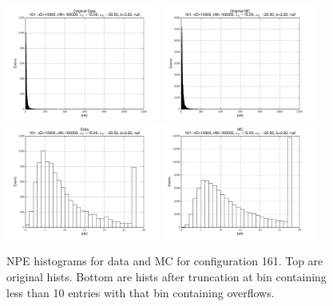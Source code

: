  \begin{figure}[htbp] \begin{center} 
\includegraphics[width=0.45\textwidth]{../FIGURES/161/FIG_Original_Data.pdf} 
\includegraphics[width=0.45\textwidth]{../FIGURES/161/FIG_Original_MC.pdf} 
\includegraphics[width=0.45\textwidth]{../FIGURES/161/FIG_Data.pdf} 
\includegraphics[width=0.45\textwidth]{../FIGURES/161/FIG_MC.pdf} 
\caption{NPE histograms for data and MC for configuration 161. Top are original hists. Bottom are hists after truncation at bin containing less than 10 entries with that bin containing overflows.} 
\label{tab:npe_161} 
\end{center} \end{figure} 
\clearpage
 